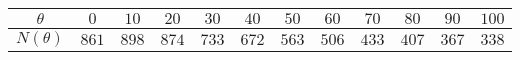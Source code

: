 \begin{tabular}{| c | c | c | c | c | c | c | c | c | c | c | c |}
\hline
$\theta$ & $0$ & $10$ & $20$ & $30$ & $40$ & $50$ & $60$ & $70$ & $80$ & $90$ & $100$\\
\hline
$N(\theta)$ & $861$ & $898$ & $874$ & $733$ & $672$ & $563$ & $506$ & $433$ & $407$ & $367$ & $338$\\
\hline
\end{tabular}

